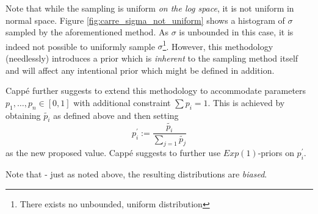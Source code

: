 	 Note that while the sampling is uniform \textit{on the log space}, it is not uniform in normal space. Figure \ref{fig:carre_sigma_not_uniform} shows a histogram of $\sigma$ sampled by the aforementioned method. As $\sigma$ is unbounded in this case, it is indeed not possible to uniformly sample $\sigma$\footnote{There exists no unbounded, uniform distribution}. However, this methodology (needlessly) introduces a prior which is \textit{inherent} to the sampling method itself and will affect any intentional prior which might be defined in addition. 
	 
	 Cappé \cite{cappe2003} further suggests to extend this methodology to accommodate parameters $p_1, \dots, p_n \in [0,1]$ with additional constraint $\sum p_i = 1$. This is achieved by obtaining $\tilde{p_i}$ as defined above and then setting
	 \[
	 	p_i^{\prime} := \frac{\tilde{p_i}}{\sum_{j=1} \tilde{p_j}}
	 \]
	 as the new proposed value. Cappé suggests to further use $Exp(1)$-priors on $p_i^{\prime}$. 
	 
	 Note that - just as noted above, the resulting distributions are \textit{biased}. 
	 
	 
 
